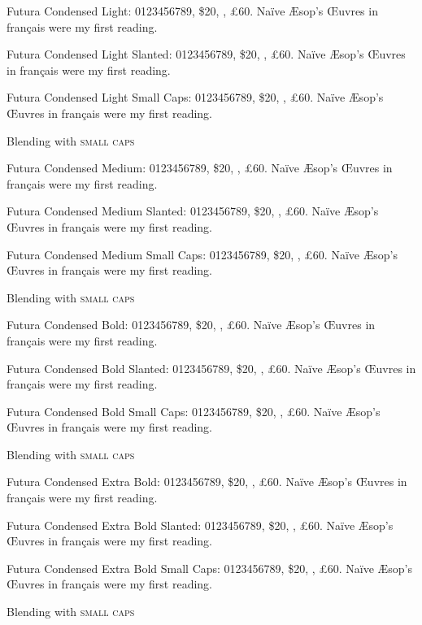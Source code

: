 \documentclass{minimal}
\begin{document}
\sffamily

{\selectfont
Futura Condensed Light:  0123456789, \$20, , \pounds60.
Na\"ive \AE sop's \OE uvres in fran\c cais were my first reading.
\lipsum[1]

{\selectfont
Futura Condensed Light Slanted:  0123456789, \$20, , \pounds60.
Na\"ive \AE sop's \OE uvres in fran\c cais were my first reading.
\lipsum[2]}

{\selectfont
Futura Condensed Light Small Caps:  0123456789, \$20, , \pounds60.
Na\"ive \AE sop's \OE uvres in fran\c cais were my first reading.
\lipsum[3]}

Blending with \textsc{small caps}}


{\selectfont
Futura Condensed Medium:  0123456789, \$20, , \pounds60.
Na\"ive \AE sop's \OE uvres in fran\c cais were my first reading.
\lipsum[11]

{\selectfont
Futura Condensed Medium Slanted:  0123456789, \$20, , \pounds60.
Na\"ive \AE sop's \OE uvres in fran\c cais were my first reading.
\lipsum[12]}

{\selectfont
Futura Condensed Medium Small Caps:  0123456789, \$20, , \pounds60.
Na\"ive \AE sop's \OE uvres in fran\c cais were my first reading.
\lipsum[13]}

Blending with \textsc{small caps}}

{\selectfont
Futura Condensed Bold:  0123456789, \$20, , \pounds60.
Na\"ive \AE sop's \OE uvres in fran\c cais were my first reading.
\lipsum[21]

{\selectfont
Futura Condensed Bold Slanted:  0123456789, \$20, , \pounds60.
Na\"ive \AE sop's \OE uvres in fran\c cais were my first reading.
\lipsum[22]}

{\selectfont
Futura Condensed Bold Small Caps:  0123456789, \$20, , \pounds60.
Na\"ive \AE sop's \OE uvres in fran\c cais were my first reading.
\lipsum[23]}

Blending with \textsc{small caps}}

{\selectfont
Futura Condensed Extra Bold:  0123456789, \$20, , \pounds60.
Na\"ive \AE sop's \OE uvres in fran\c cais were my first reading.
\lipsum[31]

{\selectfont
Futura Condensed Extra Bold Slanted:  0123456789, \$20, , \pounds60.
Na\"ive \AE sop's \OE uvres in fran\c cais were my first reading.
\lipsum[32]}

{\selectfont
Futura Condensed Extra Bold Small Caps:  0123456789, \$20, , \pounds60.
Na\"ive \AE sop's \OE uvres in fran\c cais were my first reading.
\lipsum[33]}

Blending with \textsc{small caps}}
\end{document}
